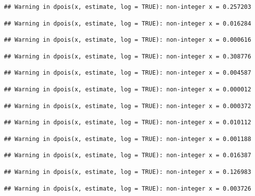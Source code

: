 \documentclass[]{article}
\begin{document}
\begin{verbatim}
## Warning in dpois(x, estimate, log = TRUE): non-integer x = 0.257203
\end{verbatim}

\begin{verbatim}
## Warning in dpois(x, estimate, log = TRUE): non-integer x = 0.016284
\end{verbatim}

\begin{verbatim}
## Warning in dpois(x, estimate, log = TRUE): non-integer x = 0.000616
\end{verbatim}

\begin{verbatim}
## Warning in dpois(x, estimate, log = TRUE): non-integer x = 0.308776
\end{verbatim}

\begin{verbatim}
## Warning in dpois(x, estimate, log = TRUE): non-integer x = 0.004587
\end{verbatim}

\begin{verbatim}
## Warning in dpois(x, estimate, log = TRUE): non-integer x = 0.000012
\end{verbatim}

\begin{verbatim}
## Warning in dpois(x, estimate, log = TRUE): non-integer x = 0.000372
\end{verbatim}

\begin{verbatim}
## Warning in dpois(x, estimate, log = TRUE): non-integer x = 0.010112
\end{verbatim}

\begin{verbatim}
## Warning in dpois(x, estimate, log = TRUE): non-integer x = 0.001188
\end{verbatim}

\begin{verbatim}
## Warning in dpois(x, estimate, log = TRUE): non-integer x = 0.016387
\end{verbatim}

\begin{verbatim}
## Warning in dpois(x, estimate, log = TRUE): non-integer x = 0.126983
\end{verbatim}

\begin{verbatim}
## Warning in dpois(x, estimate, log = TRUE): non-integer x = 0.003726
\end{verbatim}
\end{document}
